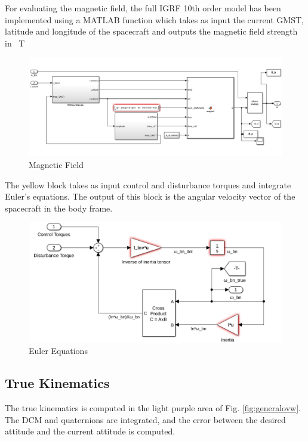 \documentclass[11pt,a4paper]{report}
\begin{document}
For evaluating the magnetic field, the full IGRF 10th order model has been implemented using a MATLAB function which takes as input the current GMST, latitude and longitude of the spacecraft and outputs the magnetic field strength in \SI{}{\tesla} 

\begin{figure}[H]
 \centering
 \includegraphics[scale=0.4]{gfx/simulink/magfield.png}
 \caption{Magnetic Field} 
 \label{fig:magfield}
\end{figure}

The yellow block takes as input control and disturbance torques and integrate Euler's equations. The output of this block is the angular velocity vector of the spacecraft in the body frame.

\begin{figure}[H]
 \centering
 \includegraphics[scale=0.4]{gfx/simulink/eulerequation.png}
 \caption{Euler Equations} 
 \label{fig:eulerequation}
\end{figure}

\subsection{True Kinematics}
The true kinematics is computed in the light purple area of Fig. \ref{fig:generalovw}. 
The DCM and quaternions are integrated, and the error between the desired attitude and the current attitude is computed.
\end{document}
